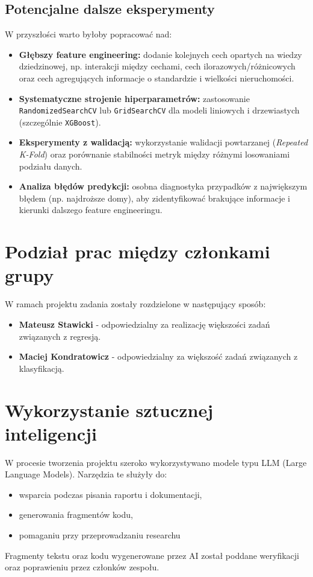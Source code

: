 \documentclass[12pt, a4paper]{article}
\begin{document}
\subsection{Potencjalne dalsze eksperymenty}

W przyszłości warto byłoby popracować nad:
\begin{itemize}
    \item \textbf{Głębszy feature engineering:} dodanie kolejnych cech opartych na wiedzy dziedzinowej, np. interakcji między cechami, cech ilorazowych/różnicowych oraz cech agregujących informacje o standardzie i wielkości nieruchomości.
    \item \textbf{Systematyczne strojenie hiperparametrów:} zastosowanie \texttt{RandomizedSearchCV} lub \texttt{GridSearchCV} dla modeli liniowych i drzewiastych (szczególnie \texttt{XGBoost}).
   
    \item \textbf{Eksperymenty z walidacją:} wykorzystanie walidacji powtarzanej (\textit{Repeated K-Fold}) oraz porównanie stabilności metryk między różnymi losowaniami podziału danych.
    \item \textbf{Analiza błędów predykcji:} osobna diagnostyka przypadków z największym błędem (np. najdroższe domy), aby zidentyfikować brakujące informacje i kierunki dalszego feature engineeringu.
\end{itemize}


\section{Podział prac między członkami grupy}
W ramach projektu zadania zostały rozdzielone w następujący sposób:

\begin{itemize}
    \item \textbf{Mateusz Stawicki} - odpowiedzialny za realizację większości zadań związanych z regresją.
    \item \textbf{Maciej Kondratowicz} - odpowiedzialny za większość zadań związanych z klasyfikacją.
\end{itemize}

\section{Wykorzystanie sztucznej inteligencji}
W procesie tworzenia projektu szeroko wykorzystywano modele typu LLM (Large Language Models). Narzędzia te służyły do:
\begin{itemize}
    \item wsparcia podczas pisania raportu i dokumentacji,
    \item generowania fragmentów kodu,
    \item pomaganiu przy przeprowadzaniu researchu
\end{itemize}

Fragmenty tekstu oraz kodu wygenerowane przez AI został poddane weryfikacji oraz poprawieniu przez członków zespołu.
\end{document}
